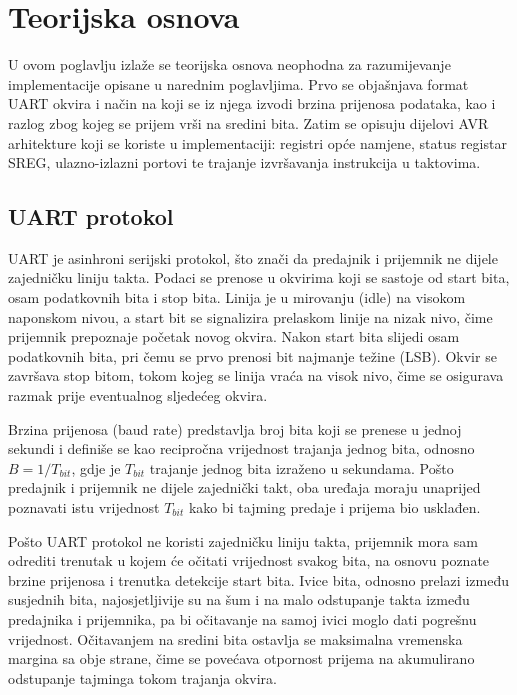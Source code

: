 %
%
\chapter{Teorijska osnova}
\label{chap:theory}
%
U ovom poglavlju izlaže se teorijska osnova neophodna za razumijevanje
implementacije opisane u narednim poglavljima. Prvo se objašnjava format
UART okvira i način na koji se iz njega izvodi brzina prijenosa podataka,
kao i razlog zbog kojeg se prijem vrši na sredini bita. Zatim se opisuju
dijelovi AVR arhitekture koji se koriste u implementaciji: registri opće
namjene, status registar SREG, ulazno-izlazni portovi te trajanje
izvršavanja instrukcija u taktovima.
%
\section{UART protokol}
\label{sec:uart}
%
UART je asinhroni serijski protokol, što znači da predajnik i prijemnik ne
dijele zajedničku liniju takta. Podaci se prenose u okvirima koji se
sastoje od start bita, osam podatkovnih bita i stop bita. Linija je u
mirovanju (\foreignlanguage{english}{idle}) na visokom naponskom nivou, a
start bit se signalizira prelaskom linije na nizak nivo, čime prijemnik
prepoznaje početak novog okvira. Nakon start bita slijedi osam podatkovnih
bita, pri čemu se prvo prenosi bit najmanje težine
(\foreignlanguage{english}{LSB}). Okvir se završava stop bitom, tokom
kojeg se linija vraća na visok nivo, čime se osigurava razmak prije
eventualnog sljedećeg okvira.

Brzina prijenosa (\foreignlanguage{english}{baud rate}) predstavlja broj
bita koji se prenese u jednoj sekundi i definiše se kao recipročna
vrijednost trajanja jednog bita, odnosno $B = 1/T_{bit}$, gdje je
$T_{bit}$ trajanje jednog bita izraženo u sekundama. Pošto predajnik i
prijemnik ne dijele zajednički takt, oba uređaja moraju unaprijed
poznavati istu vrijednost $T_{bit}$ kako bi tajming predaje i prijema bio
usklađen.

Pošto UART protokol ne koristi zajedničku liniju takta, prijemnik mora
sam odrediti trenutak u kojem će očitati vrijednost svakog bita, na
osnovu poznate brzine prijenosa i trenutka detekcije start bita. Ivice
bita, odnosno prelazi između susjednih bita, najosjetljivije su na šum i
na malo odstupanje takta između predajnika i prijemnika, pa bi očitavanje
na samoj ivici moglo dati pogrešnu vrijednost. Očitavanjem na sredini
bita ostavlja se maksimalna vremenska margina sa obje strane, čime se
povećava otpornost prijema na akumulirano odstupanje tajminga tokom
trajanja okvira.
%
